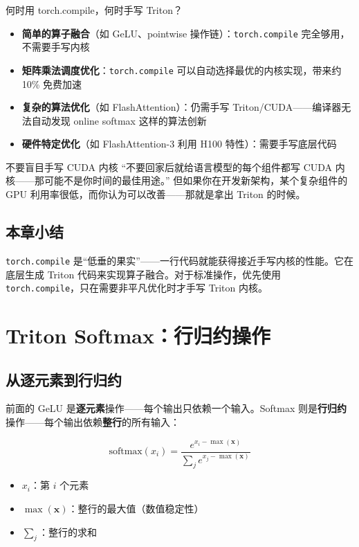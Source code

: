 \documentclass[a4paper]{article}
\begin{document}
\begin{importantbox}{何时用 torch.compile，何时手写 Triton？}
\begin{itemize}
    \item \textbf{简单的算子融合}（如 GeLU、pointwise 操作链）：\texttt{torch.compile} 完全够用，不需要手写内核
    \item \textbf{矩阵乘法调度优化}：\texttt{torch.compile} 可以自动选择最优的内核实现，带来约 10\% 免费加速
    \item \textbf{复杂的算法优化}（如 FlashAttention）：仍需手写 Triton/CUDA——编译器无法自动发现 online softmax 这样的算法创新
    \item \textbf{硬件特定优化}（如 FlashAttention-3 利用 H100 特性）：需要手写底层代码
\end{itemize}
\end{importantbox}

\begin{warningbox}{不要盲目手写 CUDA 内核}
``不要回家后就给语言模型的每个组件都写 CUDA 内核——那可能不是你时间的最佳用途。'' 但如果你在开发新架构，某个复杂组件的 GPU 利用率很低，而你认为可以改善——那就是拿出 Triton 的时候。
\end{warningbox}

\subsection{本章小结}

\texttt{torch.compile} 是``低垂的果实''——一行代码就能获得接近手写内核的性能。它在底层生成 Triton 代码来实现算子融合。对于标准操作，优先使用 \texttt{torch.compile}，只在需要非平凡优化时才手写 Triton 内核。


\section{Triton Softmax：行归约操作}

\subsection{从逐元素到行归约}

前面的 GeLU 是\textbf{逐元素}操作——每个输出只依赖一个输入。Softmax 则是\textbf{行归约}操作——每个输出依赖\textbf{整行}的所有输入：

$$\text{softmax}(x_i) = \frac{e^{x_i - \max(\mathbf{x})}}{\sum_j e^{x_j - \max(\mathbf{x})}}$$

\begin{itemize}
    \item $x_i$：第 $i$ 个元素
    \item $\max(\mathbf{x})$：整行的最大值（数值稳定性）
    \item $\sum_j$：整行的求和
\end{itemize}
\end{document}
